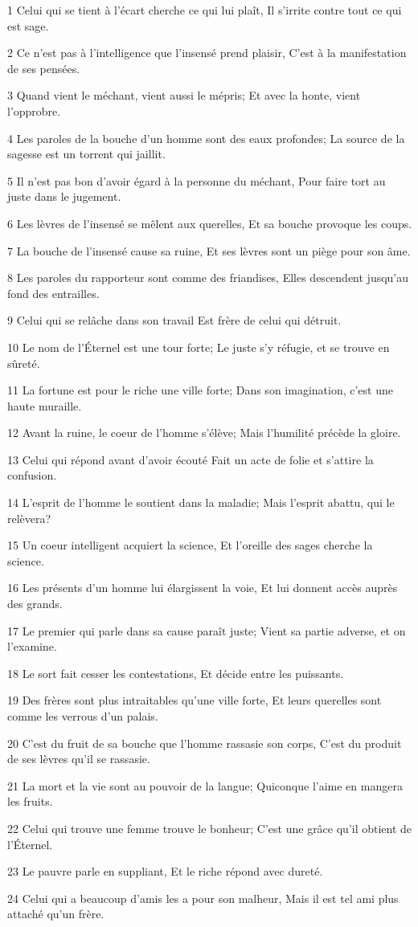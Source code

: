 \par 1 Celui qui se tient à l'écart cherche ce qui lui plaît, Il s'irrite contre tout ce qui est sage.
\par 2 Ce n'est pas à l'intelligence que l'insensé prend plaisir, C'est à la manifestation de ses pensées.
\par 3 Quand vient le méchant, vient aussi le mépris; Et avec la honte, vient l'opprobre.
\par 4 Les paroles de la bouche d'un homme sont des eaux profondes; La source de la sagesse est un torrent qui jaillit.
\par 5 Il n'est pas bon d'avoir égard à la personne du méchant, Pour faire tort au juste dans le jugement.
\par 6 Les lèvres de l'insensé se mêlent aux querelles, Et sa bouche provoque les coups.
\par 7 La bouche de l'insensé cause sa ruine, Et ses lèvres sont un piège pour son âme.
\par 8 Les paroles du rapporteur sont comme des friandises, Elles descendent jusqu'au fond des entrailles.
\par 9 Celui qui se relâche dans son travail Est frère de celui qui détruit.
\par 10 Le nom de l'Éternel est une tour forte; Le juste s'y réfugie, et se trouve en sûreté.
\par 11 La fortune est pour le riche une ville forte; Dans son imagination, c'est une haute muraille.
\par 12 Avant la ruine, le coeur de l'homme s'élève; Mais l'humilité précède la gloire.
\par 13 Celui qui répond avant d'avoir écouté Fait un acte de folie et s'attire la confusion.
\par 14 L'esprit de l'homme le soutient dans la maladie; Mais l'esprit abattu, qui le relèvera?
\par 15 Un coeur intelligent acquiert la science, Et l'oreille des sages cherche la science.
\par 16 Les présents d'un homme lui élargissent la voie, Et lui donnent accès auprès des grands.
\par 17 Le premier qui parle dans sa cause paraît juste; Vient sa partie adverse, et on l'examine.
\par 18 Le sort fait cesser les contestations, Et décide entre les puissants.
\par 19 Des frères sont plus intraitables qu'une ville forte, Et leurs querelles sont comme les verrous d'un palais.
\par 20 C'est du fruit de sa bouche que l'homme rassasie son corps, C'est du produit de ses lèvres qu'il se rassasie.
\par 21 La mort et la vie sont au pouvoir de la langue; Quiconque l'aime en mangera les fruits.
\par 22 Celui qui trouve une femme trouve le bonheur; C'est une grâce qu'il obtient de l'Éternel.
\par 23 Le pauvre parle en suppliant, Et le riche répond avec dureté.
\par 24 Celui qui a beaucoup d'amis les a pour son malheur, Mais il est tel ami plus attaché qu'un frère.

